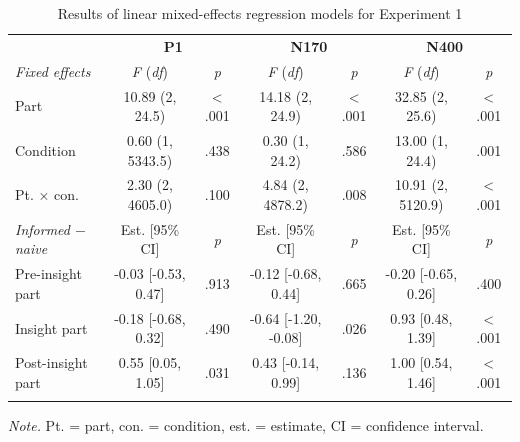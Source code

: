 \documentclass[
  english,
  man,12pt,twoside]{apa7}
\begin{document}
\begin{table}[tbp]

\begin{center}
\begin{threeparttable}

\caption{\label{tab:exp1-table}Results of linear mixed-effects regression models for Experiment 1}

\footnotesize{

\begin{tabular}{lcccccc}
\toprule
 & \multicolumn{2}{c}{\textbf{P1}} & \multicolumn{2}{c}{\textbf{N170}} & \multicolumn{2}{c}{\textbf{N400}} \\
\cmidrule(r){2-3} \cmidrule(r){4-5} \cmidrule(r){6-7}
\textit{Fixed effects} & \textit{F} (\textit{df}) & \textit{p} & \textit{F} (\textit{df}) & \textit{p} & \textit{F} (\textit{df}) & \textit{p}\\
\midrule
Part & 10.89 (2, 24.5) & < .001 & 14.18 (2, 24.9) & < .001 & 32.85 (2, 25.6) & < .001\\
Condition & 0.60 (1, 5343.5) & .438 & 0.30 (1, 24.2) & .586 & 13.00 (1, 24.4) & .001\\
Pt. × con. & 2.30 (2, 4605.0) & .100 & 4.84 (2, 4878.2) & .008 & 10.91 (2, 5120.9) & < .001\\
\textit{Informed $-$  naive} & Est. [95\% CI] & \textit{p} & Est. [95\% CI] & \textit{p} & Est. [95\% CI] & \textit{p}\\ \midrule
Pre-insight part & -0.03 [-0.53, 0.47] & .913 & -0.12 [-0.68, 0.44] & .665 & -0.20 [-0.65, 0.26] & .400\\
Insight part & -0.18 [-0.68, 0.32] & .490 & -0.64 [-1.20, -0.08] & .026 & 0.93 [0.48, 1.39] & < .001\\
Post-insight part & 0.55 [0.05, 1.05] & .031 & 0.43 [-0.14, 0.99] & .136 & 1.00 [0.54, 1.46] & < .001\\
\bottomrule
\addlinespace
\end{tabular}

}

\begin{tablenotes}[para]
\normalsize{\textit{Note.} Pt. = part, con. = condition, est. = estimate, CI = confidence interval.}
\end{tablenotes}

\end{threeparttable}
\end{center}

\end{table}
\end{document}
